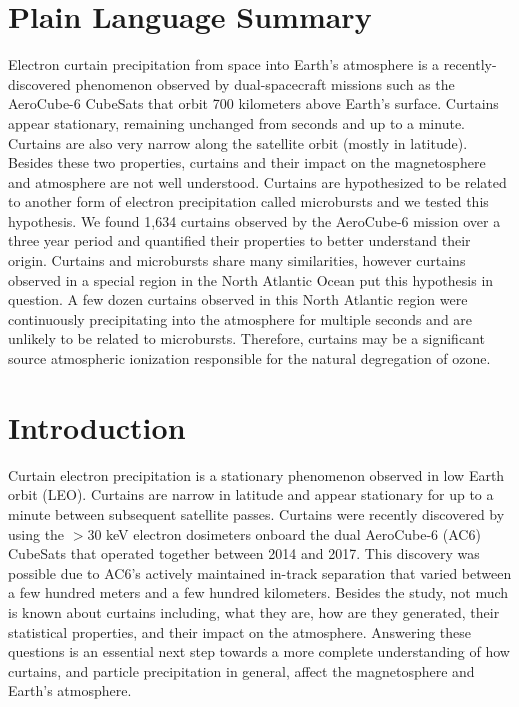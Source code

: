 \documentclass[draft]{agujournal2019}
\begin{document}
\section{Plain Language Summary}
Electron curtain precipitation from space into Earth's atmosphere is a recently-discovered phenomenon observed by dual-spacecraft missions such as the AeroCube-6 CubeSats that orbit 700 kilometers above Earth's surface. Curtains appear stationary, remaining unchanged from seconds and up to a minute. Curtains are also very narrow along the satellite orbit (mostly in latitude). Besides these two properties, curtains and their impact on the magnetosphere and atmosphere are not well understood. Curtains are hypothesized to be related to another form of electron precipitation called microbursts and we tested this hypothesis. We found 1,634 curtains observed by the AeroCube-6 mission over a three year period and quantified their properties to better understand their origin. Curtains and microbursts share many similarities, however curtains observed in a special region in the North Atlantic Ocean put this hypothesis in question. A few dozen curtains observed in this North Atlantic region were continuously precipitating into the atmosphere for multiple seconds and are unlikely to be related to microbursts. Therefore, curtains may be a significant source atmospheric ionization responsible for the natural degregation of ozone.

\section{Introduction}
Curtain electron precipitation is a stationary phenomenon observed in low Earth orbit (LEO). Curtains are narrow in latitude and appear stationary for up to a minute between subsequent satellite passes. Curtains were recently discovered by  using the $> 30$ keV electron dosimeters onboard the dual AeroCube-6 (AC6) CubeSats that operated together between 2014 and 2017. This discovery was possible due to AC6's actively maintained in-track separation that varied between a few hundred meters and a few hundred kilometers. Besides the  study, not much is known about curtains including, what they are, how are they generated, their statistical properties, and their impact on the atmosphere. Answering these questions is an essential next step towards a more complete understanding of how curtains, and particle precipitation in general, affect the magnetosphere and Earth's atmosphere.
\end{document}
